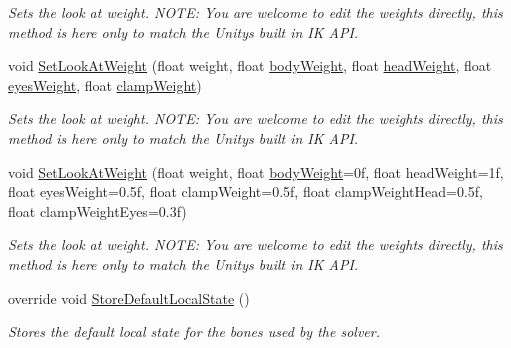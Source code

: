 \begin{DoxyCompactItemize}
\begin{DoxyCompactList}\small\item\em Sets the look at weight. N\+O\+TE\+: You are welcome to edit the weights directly, this method is here only to match the Unity\textquotesingle{}s built in IK A\+PI. \end{DoxyCompactList}\item 
void \mbox{\hyperlink{class_root_motion_1_1_final_i_k_1_1_i_k_solver_look_at_a43a0e0d404ef087e0fe097d8cd0f85b1}{Set\+Look\+At\+Weight}} (float weight, float \mbox{\hyperlink{class_root_motion_1_1_final_i_k_1_1_i_k_solver_look_at_a40750b4da8c784f94c0b166458b9c8d5}{body\+Weight}}, float \mbox{\hyperlink{class_root_motion_1_1_final_i_k_1_1_i_k_solver_look_at_a81105cdff06d5efcc81b7052570fef23}{head\+Weight}}, float \mbox{\hyperlink{class_root_motion_1_1_final_i_k_1_1_i_k_solver_look_at_a8ba8c5444746a73418df26ed95bc354e}{eyes\+Weight}}, float \mbox{\hyperlink{class_root_motion_1_1_final_i_k_1_1_i_k_solver_look_at_ab3250b9d745f18606490c0dac5c3ce1f}{clamp\+Weight}})
\begin{DoxyCompactList}\small\item\em Sets the look at weight. N\+O\+TE\+: You are welcome to edit the weights directly, this method is here only to match the Unity\textquotesingle{}s built in IK A\+PI. \end{DoxyCompactList}\item 
void \mbox{\hyperlink{class_root_motion_1_1_final_i_k_1_1_i_k_solver_look_at_a2521620b0f75ed1e01dafccf6db2d1b2}{Set\+Look\+At\+Weight}} (float weight, float \mbox{\hyperlink{class_root_motion_1_1_final_i_k_1_1_i_k_solver_look_at_a40750b4da8c784f94c0b166458b9c8d5}{body\+Weight}}=0f, float head\+Weight=1f, float eyes\+Weight=0.\+5f, float clamp\+Weight=0.\+5f, float clamp\+Weight\+Head=0.\+5f, float clamp\+Weight\+Eyes=0.\+3f)
\begin{DoxyCompactList}\small\item\em Sets the look at weight. N\+O\+TE\+: You are welcome to edit the weights directly, this method is here only to match the Unity\textquotesingle{}s built in IK A\+PI. \end{DoxyCompactList}\item 
override void \mbox{\hyperlink{class_root_motion_1_1_final_i_k_1_1_i_k_solver_look_at_a4afca882415d4749c312c52f349e1d0d}{Store\+Default\+Local\+State}} ()
\begin{DoxyCompactList}\small\item\em Stores the default local state for the bones used by the solver. \end{DoxyCompactList}\item 

\end{DoxyCompactItemize}
